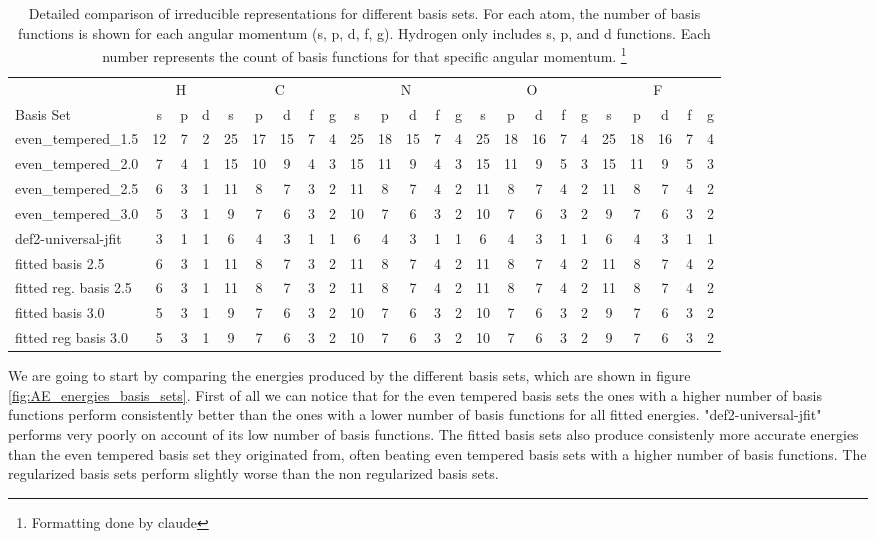 \begin{table}
\centering
\tiny
\begin{tabular}{|l|ccc|ccccc|ccccc|ccccc|ccccc|}
\hline
& \multicolumn{3}{c|}{H} & \multicolumn{5}{c|}{C} & \multicolumn{5}{c|}{N} & \multicolumn{5}{c|}{O} & \multicolumn{5}{c|}{F} \\
Basis Set & s & p & d & s & p & d & f & g & s & p & d & f & g & s & p & d & f & g & s & p & d & f & g \\
\hline
even\_tempered\_1.5 & 12 & 7 & 2 & 25 & 17 & 15 & 7 & 4 & 25 & 18 & 15 & 7 & 4 & 25 & 18 & 16 & 7 & 4 & 25 & 18 & 16 & 7 & 4 \\
even\_tempered\_2.0 & 7 & 4 & 1 & 15 & 10 & 9 & 4 & 3 & 15 & 11 & 9 & 4 & 3 & 15 & 11 & 9 & 5 & 3 & 15 & 11 & 9 & 5 & 3 \\
even\_tempered\_2.5 & 6 & 3 & 1 & 11 & 8 & 7 & 3 & 2 & 11 & 8 & 7 & 4 & 2 & 11 & 8 & 7 & 4 & 2 & 11 & 8 & 7 & 4 & 2 \\
even\_tempered\_3.0 & 5 & 3 & 1 & 9 & 7 & 6 & 3 & 2 & 10 & 7 & 6 & 3 & 2 & 10 & 7 & 6 & 3 & 2 & 9 & 7 & 6 & 3 & 2 \\
def2-universal-jfit & 3 & 1 & 1 & 6 & 4 & 3 & 1 & 1 & 6 & 4 & 3 & 1 & 1 & 6 & 4 & 3 & 1 & 1 & 6 & 4 & 3 & 1 & 1 \\
fitted basis 2.5 & 6 & 3 & 1 & 11 & 8 & 7 & 3 & 2 & 11 & 8 & 7 & 4 & 2 & 11 & 8 & 7 & 4 & 2 & 11 & 8 & 7 & 4 & 2 \\
fitted reg. basis 2.5 & 6 & 3 & 1 & 11 & 8 & 7 & 3 & 2 & 11 & 8 & 7 & 4 & 2 & 11 & 8 & 7 & 4 & 2 & 11 & 8 & 7 & 4 & 2 \\
fitted basis 3.0 & 5 & 3 & 1 & 9 & 7 & 6 & 3 & 2 & 10 & 7 & 6 & 3 & 2 & 10 & 7 & 6 & 3 & 2 & 9 & 7 & 6 & 3 & 2 \\
fitted reg basis 3.0 & 5 & 3 & 1 & 9 & 7 & 6 & 3 & 2 & 10 & 7 & 6 & 3 & 2 & 10 & 7 & 6 & 3 & 2 & 9 & 7 & 6 & 3 & 2 \\
\hline
\end{tabular}
\caption{Detailed comparison of irreducible representations for different basis sets. For each atom, the number of basis functions is shown for each angular momentum (s, p, d, f, g). Hydrogen only includes s, p, and d functions. Each number represents the count of basis functions for that specific angular momentum. \footnote{Formatting done by claude}}
\label{tab:basis-comparison-detailed}
\end{table}
We are going to start by comparing the energies produced by the different basis sets, which are shown in figure \ref{fig:AE_energies_basis_sets}. First of all we can notice that for the even tempered basis sets the ones with a higher number of basis functions perform consistently better than the ones with a lower number of basis functions for all fitted energies. "def2-universal-jfit" performs very poorly on account of its low number of basis functions. The fitted basis sets also produce consistenly more accurate energies than the even tempered basis set they originated from, often beating even tempered basis sets with a higher number of basis functions. The regularized basis sets perform slightly worse than the non regularized basis sets. \\

